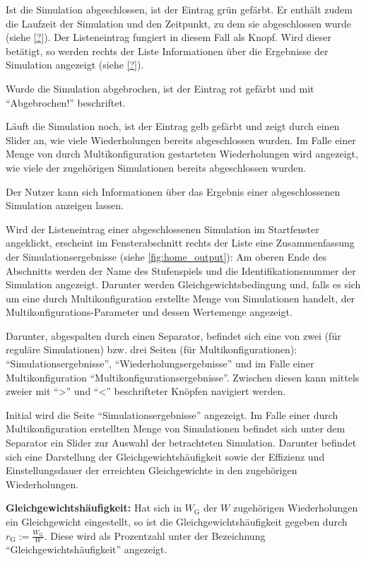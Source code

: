 \documentclass[parskip=full,11pt]{scrartcl}
\begin{document}
Ist die Simulation abgeschlossen, ist der Eintrag grün gefärbt. Er enthält zudem die Laufzeit der Simulation und den Zeitpunkt, zu dem sie abgeschlossen wurde (siehe \cref{?}). Der Listeneintrag fungiert in diesem Fall als Knopf. Wird dieser betätigt, so werden rechts der Liste Informationen über die Ergebnisse der Simulation angezeigt (siehe \cref{?}).

Wurde die Simulation abgebrochen, ist der Eintrag rot gefärbt und mit \enquote{Abgebrochen!} beschriftet.

Läuft die Simulation noch, ist der Eintrag gelb gefärbt und zeigt durch einen Slider an, wie viele Wiederholungen bereits abgeschlossen wurden. Im Falle einer Menge von durch Multikonfiguration gestarteten Wiederholungen wird angezeigt, wie viele der zugehörigen Simulationen bereits abgeschlossen wurden.

Der Nutzer kann sich Informationen über das Ergebnis einer abgeschlossenen Simulation anzeigen lassen.

Wird der Listeneintrag einer abgeschlossenen Simulation im Startfenster angeklickt, erscheint im Fensterabschnitt rechts der Liste eine Zusammenfassung der Simulationsergebnisse (siehe \cref{fig:home_output}): Am oberen Ende des Abschnitts werden der Name des Stufenspiels und die Identifikationsnummer der Simulation angezeigt. Darunter werden Gleichgewichtsbedingung und, falls es sich um eine durch Multikonfiguration erstellte Menge von Simulationen handelt, der Multikonfigurations-Parameter und dessen Wertemenge angezeigt.

Darunter, abgespalten durch einen Separator, befindet sich eine von zwei (für reguläre Simulationen) bzw. drei Seiten (für Multikonfigurationen): \enquote{Simulationsergebnisse}, \enquote{Wiederholungsergebnisse} und im Falle einer Multikonfiguration \enquote{Multikonfigurationsergebnisse}. Zwischen diesen kann mittels zweier mit \enquote{>} und \enquote{<} beschrifteter Knöpfen navigiert werden.

Initial wird die Seite \enquote{Simulationsergebnisse} angezeigt. Im Falle einer durch Multikonfiguration erstellten Menge von Simulationen befindet sich unter dem Separator ein Slider zur Auswahl der betrachteten Simulation. Darunter befindet sich eine Darstellung der Gleichgewichtshäufigkeit sowie der Effizienz und Einstellungsdauer der erreichten Gleichgewichte in den zugehörigen Wiederholungen.

\textbf{Gleichgewichtshäufigkeit:}
Hat sich in \(W_\text{G}\) der \(W\) zugehörigen Wiederholungen ein Gleichgewicht eingestellt, so ist die Gleichgewichtshäufigkeit gegeben durch \(r_\text{G} := \frac{W_\text{G}}{W}\). Diese wird als Prozentzahl unter der Bezeichnung \enquote{Gleichgewichtshäufigkeit} angezeigt.
\end{document}
